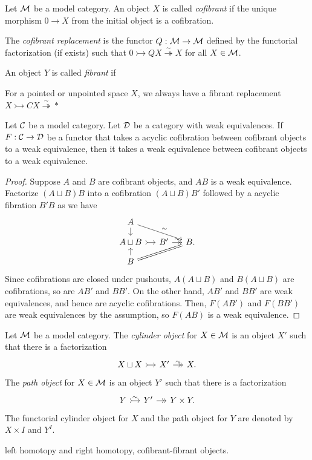 \documentclass{../../large}
\newcommand{\cof}{\rightarrowtail}
\newcommand{\tfib}{\overset\sim\twoheadrightarrow}
\begin{document}
\begin{prb}
Let $\mathcal{M}$ be a model category.
An object $X$ is called \emph{cofibrant} if the unique morphism $0\to X$ from the initial object is a cofibration.

The \emph{cofibrant replacement} is the functor $Q:\mathcal{M}\to\mathcal{M}$ defined by the functorial factorization (if exists) such that $0\cof QX\tfib X$ for all $X\in\mathcal{M}$.

An object $Y$ is called \emph{fibrant} if

For a pointed or unpointed space $X$, we always have a fibrant replacement $X\rightarrowtail CX\overset\sim\twoheadrightarrow*$
\end{prb}




\begin{prb}
Let $\mathcal{C}$ be a model category.
Let $\mathcal{D}$ be a category with weak equivalences.
If $F:\mathcal{C}\to\mathcal{D}$ be a functor that takes a acyclic cofibration between cofibrant objects to a weak equivalence, then it takes a weak equivalence between cofibrant objects to a weak equivalence.
\end{prb}
\begin{proof}
Suppose $A$ and $B$ are cofibrant objects, and $AB$ is a weak equivalence.
Factorize $(A\sqcup B)B$ into a cofibration $(A\sqcup B)B'$ followed by a acyclic fibration $B'B$ as we have
\[\begin{tikzcd}[sep=small]
A \dar\ar{rrd}{\sim} &&\\
A\sqcup B \rar[>->] & B' \rar[->>]{\sim} & B.\\
B \uar\ar[equal]{rru} &&
\end{tikzcd}\]
Since cofibrations are closed under pushouts, $A(A\sqcup B)$ and $B(A\sqcup B)$ are cofibrations, so are $AB'$ and $BB'$.
On the other hand, $AB'$ and $BB'$ are weak equivalences, and hence are acyclic cofibrations.
Then, $F(AB')$ and $F(BB')$ are weak equivalences by the assumption, so $F(AB)$ is a weak equivalence.
\end{proof}



\begin{prb}
Let $\mathcal{M}$ be a model category.
The \emph{cylinder object} for $X\in\mathcal{M}$ is an object $X'$ such that there is a factorization
\[\begin{tikzcd}[sep=small]
X\sqcup X\rar[>->]&X'\rar[->>]{\sim}&X.
\end{tikzcd}\]
The \emph{path object} for $X\in\mathcal{M}$ is an object $Y'$ such that there is a factorization
\[\begin{tikzcd}[sep=small]
Y\rar[>->]{\sim}&Y'\rar[->>]&Y\times Y.
\end{tikzcd}\]
The functorial cylinder object for $X$ and the path object for $Y$ are denoted by $X\times I$ and $Y^I$.


left homotopy and right homotopy, cofibrant-fibrant objects.
\end{prb}
\end{document}
